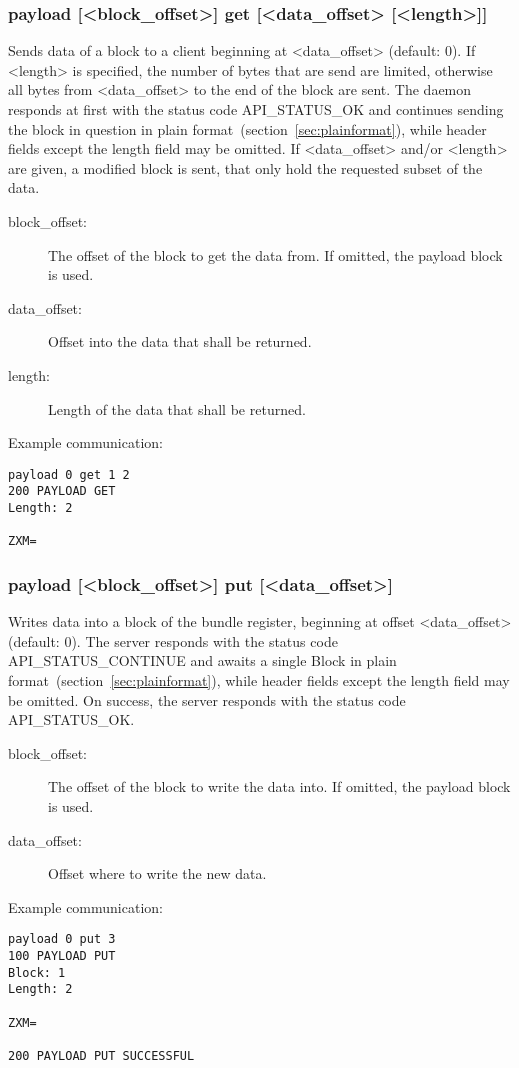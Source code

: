 \documentclass[12pt, a4paper]{scrartcl}
\begin{document}
\subsubsection*{payload [<block\_offset>] get [<data\_offset> [<length>]]}
Sends data of a block to a client beginning at <data\_offset> (default: 0).
If <length> is specified, the number of bytes that are send are limited, otherwise all bytes from <data\_offset> to the end of the block are sent.
The daemon responds at first with the status code API\_STATUS\_OK and continues sending the block in question in plain format~(section~\ref{sec:plainformat}), while header fields except the length field  may be omitted.
If <data\_offset> and/or <length> are given, a modified block is sent, that only hold the requested subset of the data.
\begin{description}
\item[block\_offset:] The offset of the block to get the data from.
	If omitted, the payload block is used.
\item[data\_offset:] Offset into the data that shall be returned.
\item[length:] Length of the data that shall be returned.
\end{description}
Example communication:\\
\makebox[\textwidth]{\hrulefill}
\begin{verbatim}
payload 0 get 1 2
200 PAYLOAD GET
Length: 2

ZXM=

\end{verbatim}
\makebox[\textwidth]{\hrulefill}
\subsubsection*{payload [<block\_offset>] put [<data\_offset>]}
Writes data into a block of the bundle register, beginning at offset <data\_offset> (default: 0).
The server responds with the status code API\_STATUS\_CONTINUE and awaits a single Block in plain format~(section~\ref{sec:plainformat}), while header fields except the length field  may be omitted.
On success, the server responds with the status code API\_STATUS\_OK.
\begin{description}
\item[block\_offset:] The offset of the block to write the data into.
	If omitted, the payload block is used.
\item[data\_offset:] Offset where to write the new data.
\end{description}
Example communication:\\
\makebox[\textwidth]{\hrulefill}
\begin{verbatim}
payload 0 put 3
100 PAYLOAD PUT
Block: 1
Length: 2

ZXM=

200 PAYLOAD PUT SUCCESSFUL
\end{verbatim}
\makebox[\textwidth]{\hrulefill}
\end{document}
